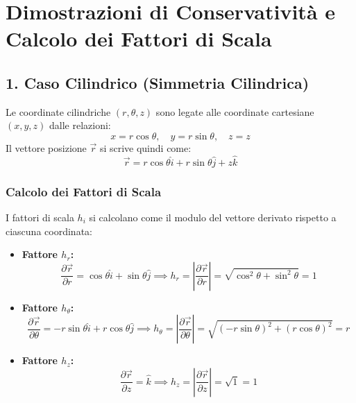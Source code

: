 \documentclass[11pt, a4paper]{article}
\begin{document}
\section*{Dimostrazioni di Conservativit\`a e Calcolo dei Fattori di Scala}

\subsection*{1. Caso Cilindrico (Simmetria Cilindrica)}
Le coordinate cilindriche $(r, \theta, z)$ sono legate alle coordinate cartesiane $(x, y, z)$ dalle relazioni:
\begin{equation*}
    x = r\cos\theta, \quad y = r\sin\theta, \quad z = z
\end{equation*}
Il vettore posizione $\vec{r}$ si scrive quindi come:
\begin{equation*}
    \vec{r} = r\cos\theta\hat{i} + r\sin\theta\hat{j} + z\hat{k}
\end{equation*}

\subsubsection*{Calcolo dei Fattori di Scala}
I fattori di scala $h_i$ si calcolano come il modulo del vettore derivato rispetto a ciascuna coordinata:
\begin{itemize}
    \item \textbf{Fattore $h_r$:}
    \begin{equation*}
        \frac{\partial \vec{r}}{\partial r} = \cos\theta\hat{i} + \sin\theta\hat{j} \implies h_r = \left| \frac{\partial \vec{r}}{\partial r} \right| = \sqrt{\cos^2\theta + \sin^2\theta} = 1
    \end{equation*}
    \item \textbf{Fattore $h_\theta$:}
    \begin{equation*}
        \frac{\partial \vec{r}}{\partial \theta} = -r\sin\theta\hat{i} + r\cos\theta\hat{j} \implies h_\theta = \left| \frac{\partial \vec{r}}{\partial \theta} \right| = \sqrt{(-r\sin\theta)^2 + (r\cos\theta)^2} = r
    \end{equation*}
    \item \textbf{Fattore $h_z$:}
    \begin{equation*}
        \frac{\partial \vec{r}}{\partial z} = \hat{k} \implies h_z = \left| \frac{\partial \vec{r}}{\partial z} \right| = \sqrt{1} = 1
    \end{equation*}
\end{itemize}
\end{document}
